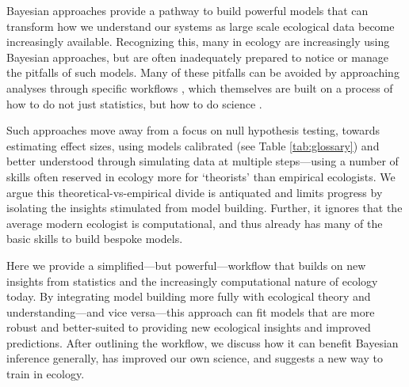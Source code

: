 \documentclass[11pt]{article}
\begin{document}
Bayesian approaches provide a pathway to build powerful models that can transform how we understand our systems as large scale ecological data become increasingly available. Recognizing this, many in ecology are increasingly using Bayesian approaches, but are often inadequately prepared to notice or manage the pitfalls of such models. Many of these pitfalls can be avoided by approaching analyses through specific workflows \citep{betanworkflow,grinsztajn2021,vandeschoot2021}, which themselves are built on a process of how to do not just statistics, but how to do science \citep{box1976science}. 

Such approaches move away from a focus on null hypothesis testing, towards estimating effect sizes, using models calibrated (see Table \ref{tab:glossary}) and better understood through simulating data at multiple steps---using a number of skills often reserved in ecology more for `theorists' than empirical ecologists. We argue this theoretical-vs-empirical divide is antiquated and limits progress by isolating the insights stimulated from model building. Further, it ignores that the average modern ecologist is computational, and thus already has many of the basic skills to build bespoke models. 

Here we provide a simplified---but powerful---workflow that builds on new insights from statistics  \citep{betanworkflow,vandeschoot2021} and the increasingly computational nature of ecology today. By integrating model building more fully with ecological theory and understanding---and vice versa---this approach can fit models that are more robust and better-suited to providing new ecological insights and improved predictions. After outlining the workflow, we discuss how it can benefit Bayesian inference generally, has improved our own science, and suggests a new way to train in ecology.
\end{document}
